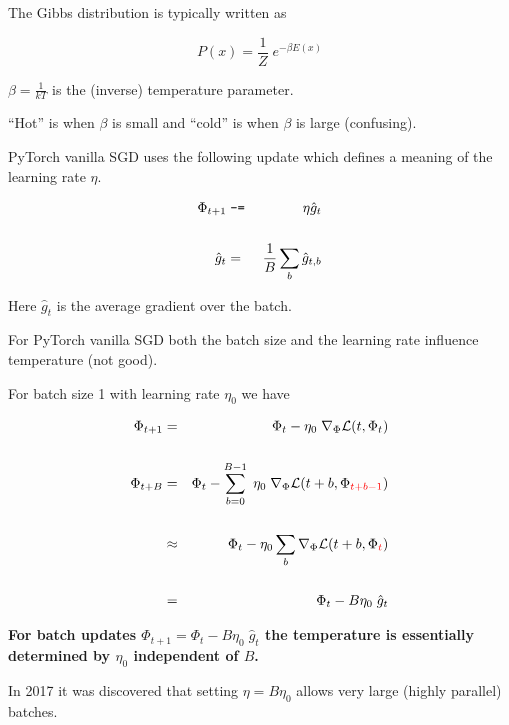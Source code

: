 {

The Gibbs distribution is typically written as

$$P(x) = \frac{1}{Z}\;e^{-\beta E(x)}$$

\vfill

$\beta = \frac{1}{kT}$ is the (inverse) temperature parameter.

\vfill
``Hot'' is when $\beta$ is small and ``cold'' is when $\beta$ is large (confusing).


PyTorch vanilla SGD uses the following update which defines a meaning of the learning rate $\eta$.

\begin{eqnarray*}
\Phi_{t+1} & \;\mbox{\tt -=}\; & \eta \hat{g}_t \\
\\
\hat{g}_t & = & \frac{1}{B} \sum_b \hat{g}_{t,b}
\end{eqnarray*}

\vfill
Here $\hat{g}_{t}$ is the average gradient over the batch.

\vfill
For PyTorch vanilla SGD both the batch size and the learning rate influence temperature (not good).


{\huge
For batch size 1 with learning rate $\eta_0$ we have

\begin{eqnarray*}
\Phi_{t+1} & = &  \Phi_{t} - \eta_0\;\nabla_\Phi {\cal L}(t,\Phi_{t}) \\
\\
\Phi_{t+B} & = &  \Phi_{t} - \sum_{b=0}^{B-1} \;\eta_0\;\nabla_\Phi {\cal L}(t+b,\Phi_{\color{red} t+b-1}) \\
\\
& \approx & \Phi_t - \eta_0 \sum_b \nabla_\Phi {\cal L}(t+b,\Phi_{\color{red} t}) \\
\\
& = & \Phi_t - B\eta_0\; \hat{g}_t
\end{eqnarray*}

\vfill
{\bf For batch updates $\Phi_{t+1} = \Phi_t - B\eta_0\; \hat{g}_t$ the temperature is essentially determined by $\eta_0$ independent of $B$.}
}


In 2017 it was discovered that setting $\eta = B\eta_0$ allows very large (highly parallel)
batches.

}
